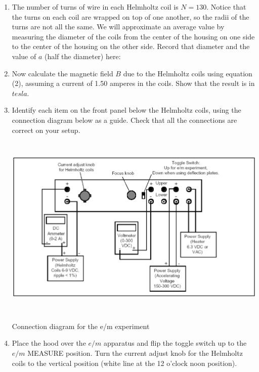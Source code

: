 \begin{enumerate}[labparts]

\item The number of turns of wire in each Helmholtz coil is $N=130$. Notice that 
the turns on each coil are wrapped on top of one another, so the radii of the 
turns are not all the same. We will approximate an average value by measuring 
the diameter of the coils from the center of the housing on one side to the 
center of the housing on the other side. Record that diameter and the value of 
$a$ (half the diameter) here:
\answerspace{0.4in}

\item Now calculate the magnetic field $B$ due to the Helmholtz coils using equation 
(2), assuming a current of 1.50 amperes in the coils. Show that the result is 
in $tesla$.
\answerspace{1.5in}

\pagebreak[3]

\item Identify each item on the front panel below
the Helmholtz coils, using the connection diagram below as a guide.
Check that all the connections are correct on your setup. 

\begin{center}
\includegraphics[trim=2mm 2mm 2mm 2mm, clip, height=3.5in]{eoverm/apparatus2.pdf}

Connection diagram for the e/m experiment

\end{center}

\item Place the hood over the $e/m$ apparatus and flip the 
toggle switch up to the $e/m$ MEASURE
position.
Turn the current adjust knob for the Helmholtz coils to the vertical position (white line
at the 12 o'clock noon position).


\end{enumerate}
